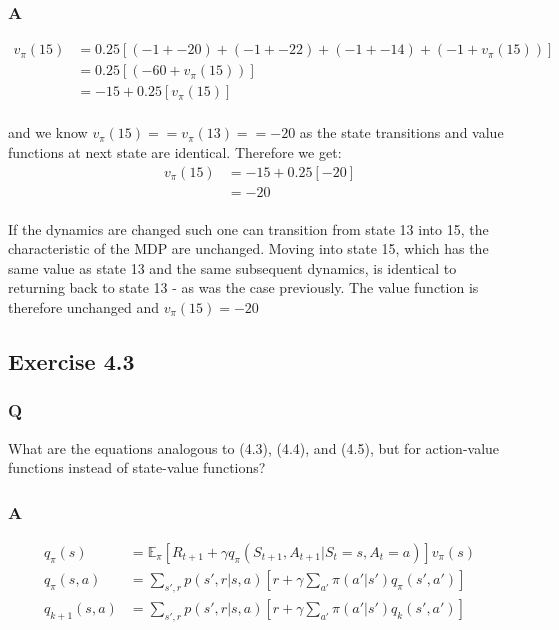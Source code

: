 \subsubsection{A}
\begin{align}
v_\pi(15) &= 0.25 \left[(-1 + -20) + (-1 + -22) + (-1 + -14) + (-1 + v_\pi(15)) \right] \\
&= 0.25 \left[(-60 + v_\pi(15)) \right] \\
&= -15 + 0.25 \left[v_\pi(15) \right] \\
\end{align}

and we know $v_\pi(15) == v_\pi(13) == -20$ as the state transitions and value functions at next state are identical. Therefore we get:
\begin{align}
v_\pi(15) &= -15 + 0.25 \left[-20\right] \\
&= -20 \\
\end{align}

If the dynamics are changed such one can transition from state 13 into 15, the characteristic of the MDP are unchanged. Moving into state 15, which has the same value as state 13 and the same subsequent dynamics, is identical to returning back to state 13 - as was the case previously. The value function is therefore unchanged and $v_\pi(15) = -20$

\subsection{Exercise 4.3}
\subsubsection{Q}
What are the equations analogous to (4.3), (4.4), and (4.5), but for action-value functions instead of state-value functions?
\subsubsection{A}
\begin{align}
q_\pi(s) &= \mathbb{E}_\pi \left[R_{t+1} + \gamma q_\pi(S_{t+1}, A_{t+1} | S_t = s, A_t = a)\right]v_\pi(s) \\
q_\pi(s,a) &= \sum_{s',r} p(s', r | s, a) \left[r + \gamma \sum_{a'} \pi(a' | s') q_\pi(s', a')\right] \\
q_{k+1}(s,a) &= \sum_{s',r} p(s', r | s, a) \left[r + \gamma \sum_{a'} \pi(a' | s') q_k(s', a')\right] \\
\end{align}

